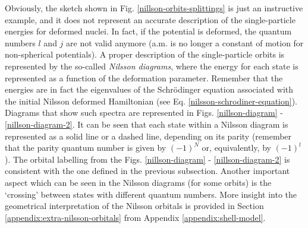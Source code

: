 Obviously, the sketch shown in Fig. \ref{nillson-orbits-splittings} is just an instructive example, and it does not represent an accurate description of the single-particle energies for deformed nuclei. In fact, if the potential is deformed, the quantum numbers $l$ and $j$ are not valid anymore (a.m. is no longer a constant of motion for non-spherical potentials). A proper description of the single-particle orbits is represented by the so-called \emph{Nilsson diagrams}, where the energy for each state is represented as a function of the deformation parameter. Remember that the energies are in fact the eigenvalues of the Schrödinger equation associated with the initial Nilsson deformed Hamiltonian (see Eq. \ref{nilsson-schrodiner-equation}). Diagrams that show such spectra are represented in Figs. \ref{nillson-diagram} - \ref{nillson-diagram-2}. It can be seen that each state within a Nilsson diagram is represented as a solid line or a dashed line, depending on its parity (remember that the parity quantum number is given by $(-1)^N$ or, equivalently, by $(-1)^l$). The orbital labelling from the Figs. \ref{nillson-diagram} - \ref{nillson-diagram-2} is consistent with the one defined in the previous subsection. Another important aspect which can be seen in the Nilsson diagrams (for some orbits) is the `crossing' between states with different quantum numbers. More insight into the geometrical interpretation of the Nilsson orbitals is provided in Section \ref{appendix:extra-nilsson-orbitals} from Appendix \ref{appendix:shell-model}.

